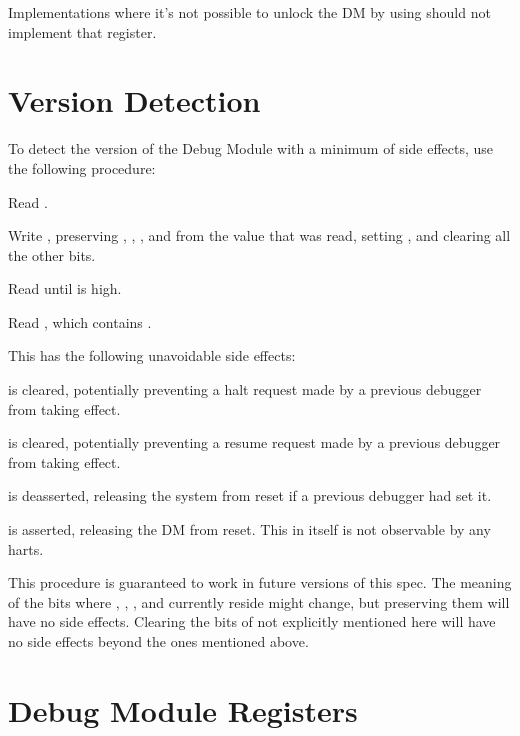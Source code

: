 Implementations where it's not possible to unlock the DM by using \RdmAuthdata
should not implement that register.

\section{Version Detection}

\begin{steps}{To detect the version of the Debug Module with a minimum of side
    effects, use the following procedure:}
    \item Read \RdmDmcontrol.
    \item Write \RdmDmcontrol, preserving \FdmDmcontrolHartreset, \FdmDmcontrolHasel, \FdmDmcontrolHartsello, and
        \FdmDmcontrolHartselhi from the value that was read, setting \FdmDmcontrolDmactive, and
        clearing all the other bits.
    \item Read \RdmDmcontrol until \FdmDmcontrolDmactive is high.
    \item Read \RdmDmstatus, which contains \FdmDmstatusVersion.
\end{steps}

\begin{steps}{This has the following unavoidable side effects:}
    \item \FdmDmcontrolHaltreq is cleared, potentially preventing a halt request made by a
        previous debugger from taking effect.
    \item \FdmDmcontrolResumereq is cleared, potentially preventing a resume request made
        by a previous debugger from taking effect.
    \item \FdmDmcontrolNdmreset is deasserted, releasing the system from reset if a
        previous debugger had set it.
    \item \FdmDmcontrolDmactive is asserted, releasing the DM from reset. This in itself
        is not observable by any harts.
\end{steps}

This procedure is guaranteed to work in future versions of this spec.  The
meaning of the \RdmDmcontrol bits where \FdmDmcontrolHartreset, \FdmDmcontrolHasel, \FdmDmcontrolHartsello, and
\FdmDmcontrolHartselhi currently reside might change, but preserving them will have no
side effects. Clearing the bits of \RdmDmcontrol not explicitly mentioned here
will have no side effects beyond the ones mentioned above.

\section{Debug Module Registers} \label{dmdebbus}

